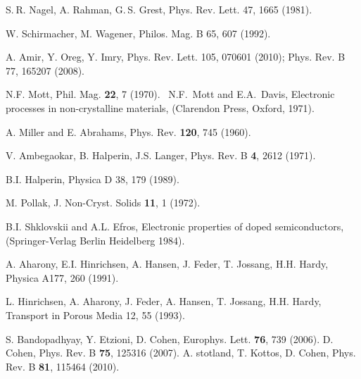 \documentclass[onecolumn,fleqn,12pt,openany,draft]{book}
\begin{document}
\begin{thebibliography}{99}



S. R. Nagel, A. Rahman, G. S. Grest, 
Phys. Rev. Lett. 47, 1665 (1981).

W. Schirmacher, M. Wagener, 
Philos. Mag. B 65, 607 (1992).


A. Amir, Y. Oreg, Y. Imry,
Phys. Rev. Lett. 105, 070601 (2010); 
%
Phys. Rev. B 77, 165207 (2008).



N.F. Mott, Phil. Mag. {\bf 22}, 7 (1970). 
\ N.F.~Mott and E.A.~Davis, 
Electronic processes in non-crystalline materials, 
(Clarendon Press, Oxford, 1971). 

A. Miller and E. Abrahams, Phys. Rev. {\bf 120}, 745 (1960).

V. Ambegaokar, B. Halperin, J.S. Langer, 
Phys. Rev. B {\bf 4}, 2612 (1971). 

B.I. Halperin, Physica D 38,  179 (1989).

M. Pollak, J. Non-Cryst. Solids {\bf 11}, 1 (1972).

B.I. Shklovskii and A.L. Efros, 
Electronic properties of doped semiconductors,
(Springer-Verlag Berlin Heidelberg 1984).




A. Aharony, E.I. Hinrichsen, A. Hansen, J. Feder, T. Jossang, H.H. Hardy,  
Physica A177, 260 (1991). 

L. Hinrichsen, A. Aharony, J. Feder, A. Hansen, T. Jossang, H.H. Hardy, 
Transport in Porous Media 12, 55 (1993). 



%
S. Bandopadhyay, Y. Etzioni, D. Cohen,
Europhys. Lett. {\bf 76}, 739 (2006).
%
D. Cohen,
Phys. Rev. B {\bf 75}, 125316 (2007).
%
A. stotland, T. Kottos, D. Cohen, 
Phys. Rev. B {\bf 81}, 115464 (2010). 



\end{thebibliography}
\end{document}
